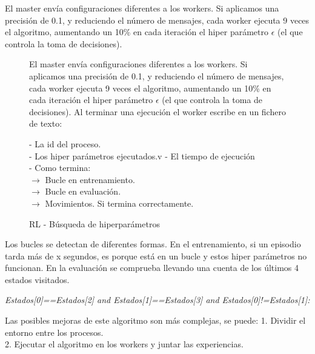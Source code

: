 	El master envía configuraciones diferentes a los workers. Si aplicamos una precisión de 0.1, y reduciendo el número de mensajes, cada worker ejecuta 9 veces el algoritmo, aumentando un 10\% en cada iteración el hiper parámetro $\epsilon$ (el que controla la toma de decisiones). 
	
	\newpage
	
	\begin{figure}			
	\begin{mdframed}[roundcorner=5pt]
		El master envía configuraciones diferentes a los workers. Si aplicamos una precisión de 0.1, y reduciendo el número de mensajes, cada worker ejecuta 9 veces el algoritmo, aumentando un 10\% en cada iteración el hiper parámetro $\epsilon$ (el que controla la toma de decisiones). Al terminar una ejecución el worker escribe en un fichero de texto: 
		
		
		\begin{tcolorbox}[boxrule=0.5pt, fontupper=\small]			
			- La id del proceso. \\
			- Los hiper parámetros ejecutados.v
			- El tiempo de ejecución \\
			- Como termina:\\
			$\rightarrow$ Bucle en entrenamiento.\\
			$\rightarrow$ Bucle en evaluación.\\
			$\rightarrow$ Movimientos. Si termina correctamente.
				
			
		\end{tcolorbox}
		
	\end{mdframed}
	\caption{RL - Búsqueda de hiperparámetros}
	\label{fig:rl_busqueda}
	\end{figure}
	
	Los bucles se detectan de diferentes formas. En el entrenamiento, si un episodio tarda más de x segundos, es porque está en un bucle y estos hiper parámetros no funcionan. En la evaluación se comprueba llevando una cuenta de los últimos 4 estados visitados. 
	\begin{center}
		\textit{Estados[0]==Estados[2] and Estados[1]==Estados[3] and Estados[0]!=Estados[1]: }
	\end{center}
	
	\begin{flushleft}
		Las posibles mejoras de este algoritmo son más complejas, se puede:	
		1. Dividir el entorno entre los procesos. \\
		2. Ejecutar el algoritmo en los workers y juntar las experiencias.\\
	\end{flushleft}
	
